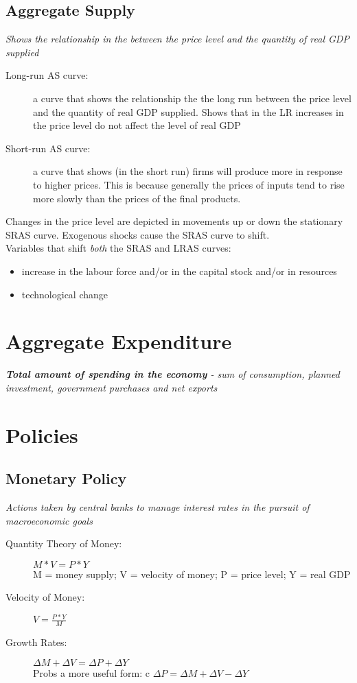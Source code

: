 \documentclass{article}
\begin{document}
\subsection{Aggregate Supply}
\label{sec:as}
\textit{Shows the relationship in the between the price level and the quantity of real GDP supplied}
\begin{description}
\item[Long-run AS curve:] a curve that shows the relationship the the long run between the price level and the quantity of real GDP supplied. Shows that in the LR increases in the price level do not affect the level of real GDP
\item[Short-run AS curve:] a curve that shows (in the short run) firms will produce more in response to higher prices. This is because generally the prices of inputs tend to rise more slowly than the prices of the final products.\\
\end{description}

Changes in the price level are depicted in movements up or down the stationary SRAS curve. Exogenous shocks cause the SRAS curve to shift.\\

Variables that shift \textit{both} the SRAS and LRAS curves:
\begin{itemize}
\item increase in the labour force and/or in the capital stock and/or in resources
\item technological change 
\end{itemize}

\section{Aggregate Expenditure}
\label{sec:ae}
\textit{\textbf{Total amount of spending in the economy} - sum of consumption, planned investment, government purchases and net exports}
\section{Policies}
\label{sec:pol}

\subsection{Monetary Policy}
\label{sec:monpol}
\textit{Actions taken by central banks to manage interest rates in the pursuit of macroeconomic goals}
\begin{description}
\item[Quantity Theory of Money:] $M*V = P*Y$\\
  M = money supply; V = velocity of money; P = price level; Y = real GDP
\item[Velocity of Money:] $V = \frac{P*Y}{M}$
\item[Growth Rates:] $\Delta M+\Delta V=\Delta P+\Delta Y$\\ Probs a more useful form: c $\Delta P = \Delta M + \Delta V - \Delta Y$
  
\end{description}
\end{document}
